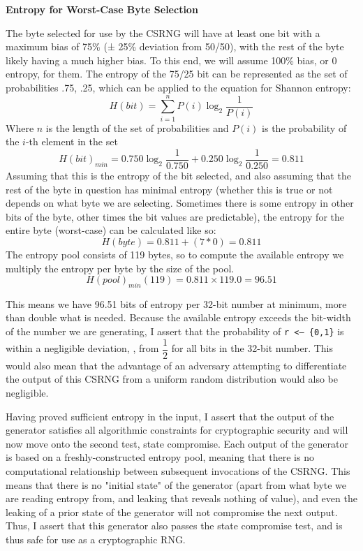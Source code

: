 \documentclass[titlepage]{article}
\renewcommand{\qed}{}
\renewenvironment{proof}{\begin{addmargin}[2em]{2em}\begin{newproof}}{\end{newproof}\end{addmargin}\qed}
\begin{document}
			\begin{mdframed}[style=exampledefault]
				\begin{proof}
				\textbf{Entropy for Worst-Case Byte Selection}
				
				The byte selected for use by the CSRNG will have at least one bit with a maximum bias of 75\% (± 25\% deviation from 50/50), with the rest of the byte likely having a much higher bias. To this end, we will assume 100\% bias, or 0 entropy, for them. The entropy of the 75/25 bit can be represented as the set of probabilities {.75, .25}, which can be applied to the equation for Shannon entropy:
		\[
			H(bit)=\sum_{i=1}^nP(i)\log_2\frac{1}{P(i)}
		\]
			Where $n$ is the length of the set of probabilities and
			$P(i)$ is the probability of the $i$-th element in the set
		\[
			H(bit)_{min}=0.750\log_2\frac{1}{0.750}+0.250\log_2\frac{1}{0.250}=0.811
		\]
			Assuming that this is the entropy of the bit selected, and also assuming that the rest of the byte in question has minimal entropy (whether this is true or not depends on what byte we are selecting. Sometimes there is some entropy in other bits of the byte, other times the bit values are predictable), the entropy for the entire byte (worst-case) can be calculated like so:
		\[
			H(byte) = 0.811 + (7*0) = 0.811			
		\]
			The entropy pool consists of 119 bytes, so to compute the available entropy we multiply the entropy per byte by the size of the pool.
		\[
			H(pool)_{min}(119)=0.811\times119.0=96.51
		\]
	\end{proof}
	\end{mdframed}
	This means we have 96.51 bits of entropy per 32-bit number at minimum, more than double what is needed. Because the available entropy exceeds the bit-width of the number we are generating, I assert that the probability of \texttt{r <-- \{0,1\}} is within a negligible deviation, \textepsilon, from $\dfrac{1}{2}$ for all bits in the 32-bit number. This would also mean that the advantage of an adversary attempting to differentiate the output of this CSRNG from a uniform random distribution would also be negligible.
	
	Having proved sufficient entropy in the input, I assert that the output of the generator satisfies all algorithmic constraints for cryptographic security and will now move onto the second test, state compromise. Each output of the generator is based on a freshly-constructed entropy pool, meaning that there is no computational relationship between subsequent invocations of the CSRNG. This means that there is no "initial state" of the generator (apart from what byte we are reading entropy from, and leaking that reveals nothing of value), and even the leaking of a prior state of the generator will not compromise the next output. Thus, I assert that this generator also passes the state compromise test, and is thus safe for use as a cryptographic RNG.
	
\end{document}
